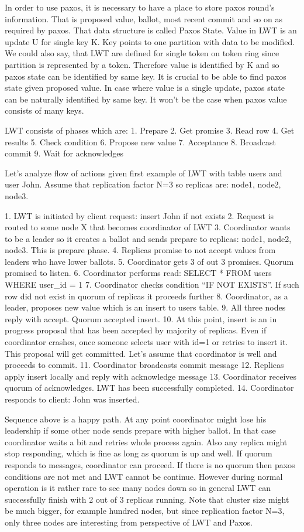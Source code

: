 In order to use paxos, it is necessary to have a place to store paxos round’s information. That is proposed value, ballot, most recent commit and so on as required by paxos. That data structure is called Paxos State.
Value in LWT is an update U for single key K. Key points to one partition with data to be modified. We could also say, that LWT are defined for single token on token ring since partition is represented by a token.
Therefore value is identified by K and so paxos state can be identified by same key. It is crucial to be able to find paxos state given proposed value. In case where value is a single update, paxos state can be naturally identified by same key. It won’t be the case when paxos value consists of many keys.


LWT consists of phases which are:
1. Prepare
2. Get promise
3. Read row
4. Get results
5. Check condition
6. Propose new value
7. Acceptance
8. Broadcast commit
9. Wait for acknowledges


Let’s analyze flow of actions given first example of LWT with table users and user John.
Assume that replication factor N=3 so replicas are: node1, node2, node3.


1. LWT is initiated by client request: insert John if not exists
2. Request is routed to some node X that becomes coordinator of LWT
3. Coordinator wants to be a leader so it creates a ballot and sends prepare to replicas: node1, node2, node3. This is prepare phase.
4. Replicas promise to not accept values from leaders who have lower ballots.
5. Coordinator gets 3 of out 3 promises. Quorum promised to listen.
6. Coordinator performs read: SELECT * FROM users WHERE user_id = 1
7. Coordinator checks condition “IF NOT EXISTS”. If such row did not exist in quorum of replicas it proceeds further
8. Coordinator, as a leader, proposes new value which is an insert to users table.
9. All three nodes reply with accept. Quorum accepted insert.
10. At this point, insert is an in progress proposal that has been accepted by majority of replicas. Even if coordinator crashes, once someone selects user with id=1 or retries to insert it. This proposal will get committed. Let’s assume that coordinator is well and proceeds to commit.
11. Coordinator broadcasts commit message
12. Replicas apply insert locally and reply with acknowledge message
13. Coordinator receives quorum of acknowledges. LWT has been successfully completed.
14. Coordinator responds to client: John was inserted.


Sequence above is a happy path. At any point coordinator might lose his leadership if some other node sends prepare with higher ballot. In that case coordinator waits a bit and retries whole process again. 
Also any replica might stop responding, which is fine as long as quorum is up and well. If quorum responds to messages, coordinator can proceed. If there is no quorum then paxos conditions are not met and LWT cannot be continue. However during normal operation is it rather rare to see many nodes down so in general LWT can successfully finish with 2 out of 3 replicas running. Note that cluster size might be much bigger, for example hundred nodes, but since replication factor N=3, only three nodes are interesting from perspective of LWT and Paxos.


